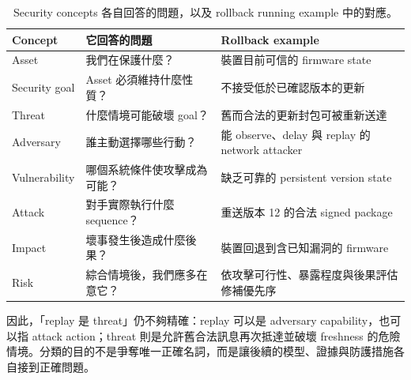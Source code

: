 \documentclass[11pt,a4paper,oneside,openany]{book}
\begin{document}
\begin{table}[htbp]
\centering
\caption{Security concepts 各自回答的問題，以及 rollback running example 中的對應。}
\label{tab:security-concept-layers}
\begin{tabularx}{\textwidth}{@{}>{\raggedright\arraybackslash}p{}>{\raggedright\arraybackslash}p{}Y@{}}
\toprule
Concept & 它回答的問題 & Rollback example \\
\midrule
Asset & 我們在保護什麼？ & 裝置目前可信的 firmware state \\
Security goal & Asset 必須維持什麼性質？ & 不接受低於已確認版本的更新 \\
Threat & 什麼情境可能破壞 goal？ & 舊而合法的更新封包可被重新送達 \\
Adversary & 誰主動選擇哪些行動？ & 能 observe、delay 與 replay 的 network attacker \\
Vulnerability & 哪個系統條件使攻擊成為可能？ & 缺乏可靠的 persistent version state \\
Attack & 對手實際執行什麼 sequence？ & 重送版本 12 的合法 signed package \\
Impact & 壞事發生後造成什麼後果？ & 裝置回退到含已知漏洞的 firmware \\
Risk & 綜合情境後，我們應多在意它？ & 依攻擊可行性、暴露程度與後果評估修補優先序 \\
\bottomrule
\end{tabularx}
\end{table}

因此，「replay 是 threat」仍不夠精確：replay 可以是 adversary capability，也可以指 attack action；threat 則是允許舊合法訊息再次抵達並破壞 freshness 的危險情境。分類的目的不是爭奪唯一正確名詞，而是讓後續的模型、證據與防護措施各自接到正確問題。
\end{document}
